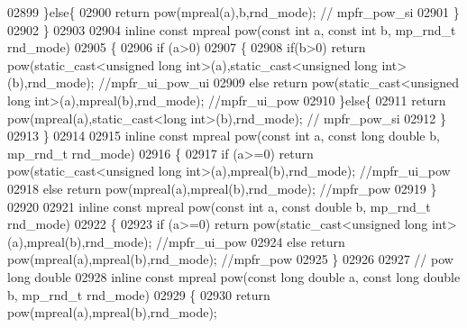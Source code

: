 \begin{DoxyCode}
{{02899     \}\textcolor{keywordflow}{else}\{
02900         \textcolor{keywordflow}{return} pow(mpreal(a),b,rnd\_mode); \textcolor{comment}{// mpfr\_pow\_si}
02901     \}
02902 \}
02903 
02904 \textcolor{keyword}{inline} \textcolor{keyword}{const} mpreal pow(\textcolor{keyword}{const} \textcolor{keywordtype}{int} a, \textcolor{keyword}{const} \textcolor{keywordtype}{int} b, mp\_rnd\_t rnd\_mode)
02905 \{
02906     \textcolor{keywordflow}{if} (a>0)
02907     \{
02908         \textcolor{keywordflow}{if}(b>0) \textcolor{keywordflow}{return} pow(static\_cast<unsigned long int>(a),static\_cast<unsigned long int>(b),rnd\_mode); \textcolor{comment}{
      //mpfr\_ui\_pow\_ui}
02909         \textcolor{keywordflow}{else}    \textcolor{keywordflow}{return} pow(static\_cast<unsigned long int>(a),mpreal(b),rnd\_mode); \textcolor{comment}{//mpfr\_ui\_pow}
02910     \}\textcolor{keywordflow}{else}\{
02911         \textcolor{keywordflow}{return} pow(mpreal(a),static\_cast<long int>(b),rnd\_mode); \textcolor{comment}{// mpfr\_pow\_si}
02912     \}
02913 \}
02914 
02915 \textcolor{keyword}{inline} \textcolor{keyword}{const} mpreal pow(\textcolor{keyword}{const} \textcolor{keywordtype}{int} a, \textcolor{keyword}{const} \textcolor{keywordtype}{long} \textcolor{keywordtype}{double} b, mp\_rnd\_t rnd\_mode)
02916 \{
02917     \textcolor{keywordflow}{if} (a>=0)   \textcolor{keywordflow}{return} pow(static\_cast<unsigned long int>(a),mpreal(b),rnd\_mode); \textcolor{comment}{//mpfr\_ui\_pow}
02918     \textcolor{keywordflow}{else}        \textcolor{keywordflow}{return} pow(mpreal(a),mpreal(b),rnd\_mode); \textcolor{comment}{//mpfr\_pow}
02919 \}
02920 
02921 \textcolor{keyword}{inline} \textcolor{keyword}{const} mpreal pow(\textcolor{keyword}{const} \textcolor{keywordtype}{int} a, \textcolor{keyword}{const} \textcolor{keywordtype}{double} b, mp\_rnd\_t rnd\_mode)
02922 \{
02923     \textcolor{keywordflow}{if} (a>=0)   \textcolor{keywordflow}{return} pow(static\_cast<unsigned long int>(a),mpreal(b),rnd\_mode); \textcolor{comment}{//mpfr\_ui\_pow}
02924     \textcolor{keywordflow}{else}        \textcolor{keywordflow}{return} pow(mpreal(a),mpreal(b),rnd\_mode); \textcolor{comment}{//mpfr\_pow}
02925 \}
02926 
02927 \textcolor{comment}{// pow long double}
02928 \textcolor{keyword}{inline} \textcolor{keyword}{const} mpreal pow(\textcolor{keyword}{const} \textcolor{keywordtype}{long} \textcolor{keywordtype}{double} a, \textcolor{keyword}{const} \textcolor{keywordtype}{long} \textcolor{keywordtype}{double} b, mp\_rnd\_t rnd\_mode)
02929 \{
02930     \textcolor{keywordflow}{return} pow(mpreal(a),mpreal(b),rnd\_mode);
}}
\end{DoxyCode}
